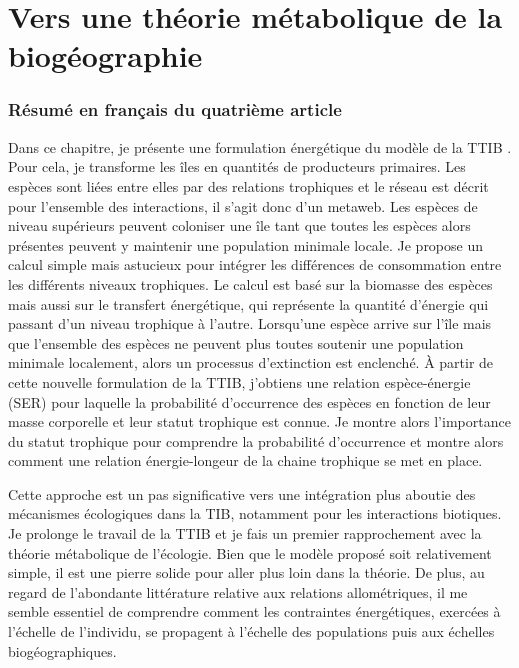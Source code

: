 \chapter{Vers une théorie métabolique de la biogéographie}
\label{chap4}


\subsection{Résumé en français du quatrième article}

Dans ce chapitre, je présente une formulation énergétique du modèle
de la TTIB \citep{Gravel2011}. Pour cela, je transforme les îles en
quantités de producteurs primaires. Les espèces sont liées entre elles
par des relations trophiques et le réseau est décrit pour l'ensemble des interactions,
il s'agit donc d'un metaweb. Les espèces de niveau supérieurs peuvent coloniser
une île tant que toutes les espèces alors présentes peuvent y maintenir une
population minimale locale. Je propose un calcul simple mais astucieux pour
intégrer les différences de consommation entre les différents niveaux trophiques.
Le calcul est basé sur la biomasse des espèces mais aussi sur le transfert énergétique,
qui représente la quantité d'énergie qui passant d'un niveau trophique à l'autre.
Lorsqu'une espèce arrive sur l'île mais que l'ensemble des espèces ne peuvent
plus toutes soutenir une population minimale localement, alors un processus
d'extinction est enclenché. À partir de cette nouvelle formulation de la
TTIB, j'obtiens une relation espèce-énergie (SER) pour laquelle la probabilité
d'occurrence des espèces en fonction de leur masse corporelle et
leur statut trophique est connue. Je montre alors l'importance du statut trophique
pour comprendre la probabilité d'occurrence et montre alors comment une relation
énergie-longeur de la chaine trophique se met en place.

Cette approche est un pas significative vers une intégration plus aboutie des
mécanismes écologiques dans la TIB, notamment pour les
interactions biotiques. Je prolonge le travail de la TTIB et
je fais un premier rapprochement avec la théorie métabolique de l'écologie.
Bien que le modèle proposé soit relativement simple, il est une pierre solide pour
aller plus loin dans la théorie. De plus, au regard de l'abondante littérature
relative aux relations allométriques, il me semble essentiel de comprendre
comment les contraintes énergétiques, exercées à l'échelle de l'individu,
se propagent à l’échelle des populations puis aux échelles biogéographiques.



